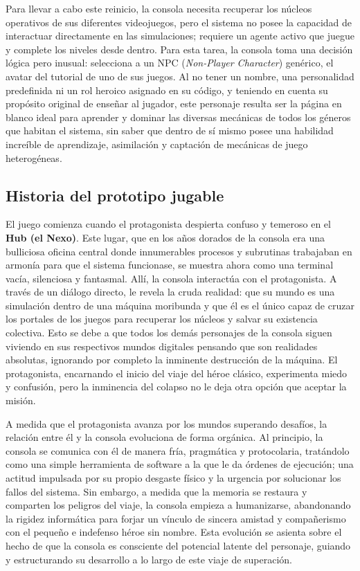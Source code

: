 Para llevar a cabo este reinicio, la consola necesita recuperar los núcleos operativos de sus diferentes videojuegos, pero el sistema no posee la capacidad de interactuar directamente en las simulaciones; requiere un agente activo que juegue y complete los niveles desde dentro. Para esta tarea, la consola toma una decisión lógica pero inusual: selecciona a un NPC (\textit{Non-Player Character}) genérico, el avatar del tutorial de uno de sus juegos. Al no tener un nombre, una personalidad predefinida ni un rol heroico asignado en su código, y teniendo en cuenta su propósito original de enseñar al jugador, este personaje resulta ser la página en blanco ideal para aprender y dominar las diversas mecánicas de todos los géneros que habitan el sistema, sin saber que dentro de sí mismo posee una habilidad increíble de aprendizaje, asimilación y captación de mecánicas de juego heterogéneas.

\subsection{Historia del prototipo jugable}
\label{subsec:historia}

El juego comienza cuando el protagonista despierta confuso y temeroso en el \textbf{Hub (el Nexo)}. Este lugar, que en los años dorados de la consola era una bulliciosa oficina central donde innumerables procesos y subrutinas trabajaban en armonía para que el sistema funcionase, se muestra ahora como una terminal vacía, silenciosa y fantasmal. Allí, la consola interactúa con el protagonista. A través de un diálogo directo, le revela la cruda realidad: que su mundo es una simulación dentro de una máquina moribunda y que él es el único capaz de cruzar los portales de los juegos para recuperar los núcleos y salvar su existencia colectiva. Esto se debe a que todos los demás personajes de la consola siguen viviendo en sus respectivos mundos digitales pensando que son realidades absolutas, ignorando por completo la inminente destrucción de la máquina. El protagonista, encarnando el inicio del viaje del héroe clásico, experimenta miedo y confusión, pero la inminencia del colapso no le deja otra opción que aceptar la misión.

A medida que el protagonista avanza por los mundos superando desafíos, la relación entre él y la consola evoluciona de forma orgánica. Al principio, la consola se comunica con él de manera fría, pragmática y protocolaria, tratándolo como una simple herramienta de software a la que le da órdenes de ejecución; una actitud impulsada por su propio desgaste físico y la urgencia por solucionar los fallos del sistema. Sin embargo, a medida que la memoria se restaura y comparten los peligros del viaje, la consola empieza a humanizarse, abandonando la rigidez informática para forjar un vínculo de sincera amistad y compañerismo con el pequeño e indefenso héroe sin nombre. Esta evolución se asienta sobre el hecho de que la consola es consciente del potencial latente del personaje, guiando y estructurando su desarrollo a lo largo de este viaje de superación.

